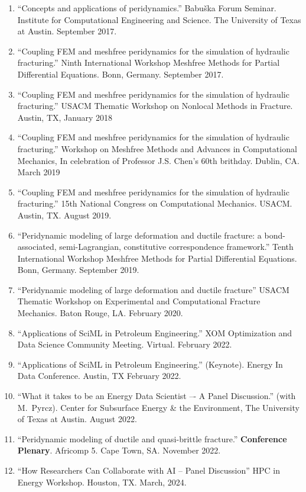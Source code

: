 \begin{enumerate}[resume]
    \item ``Concepts and applications of peridynamics.'' Babu\v{s}ka Forum Seminar. Institute for Computational Engineering and Science. The University of Texas at Austin. September 2017.
    \item ``Coupling FEM and meshfree peridynamics for the simulation of hydraulic fracturing.'' Ninth International Workshop Meshfree Methods for Partial Differential Equations. Bonn, Germany. September 2017.
    \item ``Coupling FEM and meshfree peridynamics for the simulation of hydraulic fracturing.'' USACM Thematic Workshop on Nonlocal Methods in Fracture.  Austin, TX, January 2018
    \item ``Coupling FEM and meshfree peridynamics for the simulation of hydraulic fracturing.'' Workshop on Meshfree Methods and Advances in Computational Mechanics, In celebration of Professor J.S. Chen's 60th brithday.  Dublin, CA.  March 2019
    \item ``Coupling FEM and meshfree peridynamics for the simulation of hydraulic fracturing.'' 15th National Congress on Computational Mechanics. USACM. Austin, TX. August 2019.
    \item ``Peridynamic modeling of large deformation and ductile fracture: a bond-associated, semi-Lagrangian, constitutive correspondence framework.'' Tenth International Workshop Meshfree Methods for Partial Differential Equations. Bonn, Germany. September 2019.
    \item ``Peridynamic modeling of large deformation and ductile fracture'' USACM Thematic Workshop on Experimental and Computational Fracture Mechanics. Baton Rouge, LA. February 2020.
    \item ``Applications of SciML in Petroleum Engineering.'' XOM Optimization and Data Science Community Meeting.  Virtual. February 2022.
    \item ``Applications of SciML in Petroleum Engineering.'' (Keynote). Energy In Data Conference. Austin, TX February 2022.
    \item ``What it takes to be an Energy Data Scientist –- A Panel Discussion.'' (with M.\ Pyrcz). Center for Subsurface Energy \& the Environment, The University of Texas at Austin.  August 2022.
    \item ``Peridynamic modeling of ductile and quasi-brittle fracture.''  {\bf Conference Plenary}. Africomp 5. Cape Town, SA.  November 2022.
    \item ``How Researchers Can Collaborate with AI -- Panel Discussion''  HPC in Energy Workshop. Houston, TX.  March, 2024.

\end{enumerate}

